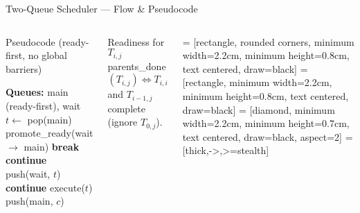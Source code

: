 \begin{frame}{Two-Queue Scheduler — Flow \& Pseudocode}
\footnotesize
\begin{columns}[T,onlytextwidth]

\begin{block}{Pseudocode (ready-first, no global barriers)}
  \footnotesize
  \begin{algorithmic}[1]
    \State \textbf{Queues:} main (ready-first), wait
      \State $t \gets$ pop(main)
        \State promote\_ready(wait $\rightarrow$ main)
         \textbf{break} \EndIf
        \State \textbf{continue}
      \EndIf
       
        \State push(wait, $t$) 
        \State \textbf{continue}
      \EndIf
      \State execute($t$)
        \State push(main, $c$) 
      \EndFor
    \EndWhile
  \end{algorithmic}
\end{block}

  \vspace{1mm}
  \begin{block}{Readiness for $T_{i,j}$}
    parents\_done$(T_{i,j}) \iff T_{i,i}$ and $T_{i-1,j}$ complete \;(ignore $T_{0,j}$).
  \end{block}

   = [rectangle, rounded corners, minimum width=2.2cm, minimum height=0.8cm, text centered, draw=black]
     = [rectangle, minimum width=2.2cm, minimum height=0.8cm, text centered, draw=black]
    = [diamond,   minimum width=2.2cm, minimum height=0.7cm, text centered, draw=black, aspect=2]
       = [thick,->,>=stealth]

  \centering
\end{columns}
\end{frame}
